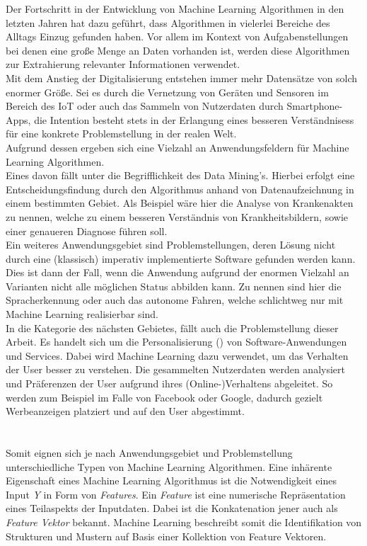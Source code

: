 Der Fortschritt in der Entwicklung von Machine Learning Algorithmen in den letzten Jahren hat dazu geführt, dass Algorithmen in vielerlei Bereiche des Alltags Einzug gefunden haben. Vor allem im Kontext von Aufgabenstellungen bei denen eine große Menge an Daten vorhanden ist, werden diese Algorithmen zur Extrahierung relevanter Informationen verwendet. \\
Mit dem Anstieg der Digitalisierung entstehen immer mehr Datensätze von solch enormer Größe. Sei es durch die Vernetzung von Geräten und Sensoren im Bereich des IoT oder auch das Sammeln von Nutzerdaten durch Smartphone-Apps, die Intention besteht stets in der Erlangung eines besseren Verständnisess für eine konkrete Problemstellung in der realen Welt. \\
Aufgrund dessen ergeben sich eine Vielzahl an Anwendungsfeldern für Machine Learning Algorithmen.\\
Eines davon fällt unter die Begrifflichkeit des Data Mining's. Hierbei erfolgt eine Entscheidungsfindung durch den Algorithmus anhand von Datenaufzeichnung in einem bestimmten Gebiet. Als Beispiel wäre hier die Analyse von Krankenakten zu nennen, welche zu einem besseren Verständnis von Krankheitsbildern, sowie einer genaueren Diagnose führen soll. \\
Ein weiteres Anwendungsgebiet sind Problemstellungen, deren Lösung nicht durch eine (klassisch) imperativ implementierte Software gefunden werden kann.
Dies ist dann der Fall, wenn die Anwendung aufgrund der enormen Vielzahl an Varianten nicht alle möglichen Status abbilden kann. Zu nennen sind hier die Spracherkennung oder auch das autonome Fahren, welche schlichtweg nur mit Machine Learning realisierbar sind.\\
In die Kategorie des nächsten Gebietes, fällt auch die Problemstellung dieser Arbeit. Es handelt sich um die Personalisierung () von Software-Anwendungen und Services. Dabei wird Machine Learning dazu verwendet, um das Verhalten der User besser zu verstehen. Die gesammelten Nutzerdaten werden analysiert und Präferenzen der User aufgrund ihres (Online-)Verhaltens abgeleitet. So werden zum Beispiel im Falle von Facebook oder Google, dadurch gezielt Werbeanzeigen platziert und auf den User abgestimmt.\\ \cite{mlmitchel} \\\\
Somit eignen sich je nach Anwendungsgebiet und Problemstellung unterschiedliche Typen von Machine Learning Algorithmen. 
Eine inhärente Eigenschaft eines Machine Learning Algorithmus ist die Notwendigkeit eines Input \textit{Y} in Form von \textit{Features}. Ein \textit{Feature} ist eine numerische Repräsentation eines Teilaspekts der Inputdaten. Dabei ist die Konkatenation jener auch als \textit{Feature Vektor} bekannt. Machine Learning beschreibt somit die Identifikation von Strukturen und Mustern auf Basis einer Kollektion von Feature Vektoren. \cite{fteng} \\\\
